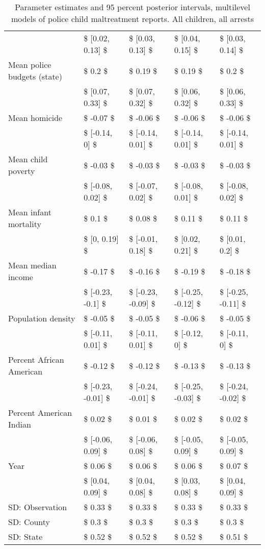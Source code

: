 \begin{table}[ht]
\begin{tabular}{lllll}
   & \$ [0.02, 0.13] \$ & \$ [0.03, 0.13] \$ & \$ [0.04, 0.15] \$ & \$ [0.03, 0.14] \$ \\ 
  Mean police budgets (state) & \$ 0.2 \$ & \$ 0.19 \$ & \$ 0.19 \$ & \$ 0.2 \$ \\ 
   & \$ [0.07, 0.33] \$ & \$ [0.07, 0.32] \$ & \$ [0.06, 0.32] \$ & \$ [0.06, 0.33] \$ \\ 
  Mean homicide & \$ -0.07 \$ & \$ -0.06 \$ & \$ -0.06 \$ & \$ -0.06 \$ \\ 
   & \$ [-0.14, 0] \$ & \$ [-0.14, 0.01] \$ & \$ [-0.14, 0.01] \$ & \$ [-0.14, 0.01] \$ \\ 
  Mean child poverty & \$ -0.03 \$ & \$ -0.03 \$ & \$ -0.03 \$ & \$ -0.03 \$ \\ 
   & \$ [-0.08, 0.02] \$ & \$ [-0.07, 0.02] \$ & \$ [-0.08, 0.01] \$ & \$ [-0.08, 0.02] \$ \\ 
  Mean infant mortality & \$ 0.1 \$ & \$ 0.08 \$ & \$ 0.11 \$ & \$ 0.11 \$ \\ 
   & \$ [0, 0.19] \$ & \$ [-0.01, 0.18] \$ & \$ [0.02, 0.21] \$ & \$ [0.01, 0.2] \$ \\ 
  Mean median income & \$ -0.17 \$ & \$ -0.16 \$ & \$ -0.19 \$ & \$ -0.18 \$ \\ 
   & \$ [-0.23, -0.1] \$ & \$ [-0.23, -0.09] \$ & \$ [-0.25, -0.12] \$ & \$ [-0.25, -0.11] \$ \\ 
  Population density & \$ -0.05 \$ & \$ -0.05 \$ & \$ -0.06 \$ & \$ -0.05 \$ \\ 
   & \$ [-0.11, 0.01] \$ & \$ [-0.11, 0.01] \$ & \$ [-0.12, 0] \$ & \$ [-0.11, 0] \$ \\ 
  Percent African American & \$ -0.12 \$ & \$ -0.12 \$ & \$ -0.13 \$ & \$ -0.13 \$ \\ 
   & \$ [-0.23, -0.01] \$ & \$ [-0.24, -0.01] \$ & \$ [-0.25, -0.03] \$ & \$ [-0.24, -0.02] \$ \\ 
  Percent American Indian & \$ 0.02 \$ & \$ 0.01 \$ & \$ 0.02 \$ & \$ 0.02 \$ \\ 
   & \$ [-0.06, 0.09] \$ & \$ [-0.06, 0.08] \$ & \$ [-0.05, 0.09] \$ & \$ [-0.05, 0.09] \$ \\ 
  Year & \$ 0.06 \$ & \$ 0.06 \$ & \$ 0.06 \$ & \$ 0.07 \$ \\ 
   & \$ [0.04, 0.09] \$ & \$ [0.04, 0.08] \$ & \$ [0.03, 0.08] \$ & \$ [0.04, 0.09] \$ \\ 
  SD: Observation & \$ 0.33 \$ & \$ 0.33 \$ & \$ 0.33 \$ & \$ 0.33 \$ \\ 
  SD: County & \$ 0.3 \$ & \$ 0.3 \$ & \$ 0.3 \$ & \$ 0.3 \$ \\ 
  SD: State & \$ 0.52 \$ & \$ 0.52 \$ & \$ 0.52 \$ & \$ 0.51 \$ \\ 
   \hline
\end{tabular}
\caption{Parameter estimates and 95 percent posterior intervals, multilevel models of 
             police child maltreatment reports. All children, all arrests} 
\end{table}
